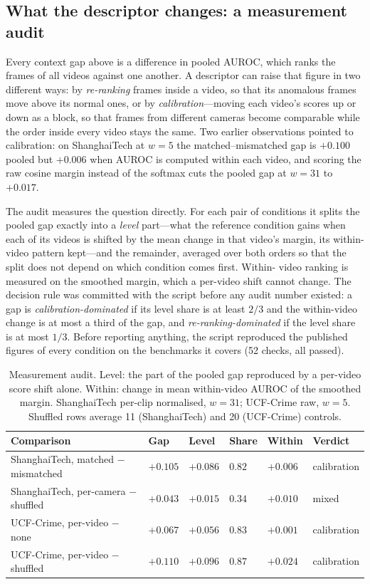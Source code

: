 \documentclass[a4paper,fleqn]{cas-sc}
\begin{document}
\subsection{What the descriptor changes: a measurement audit}
\label{sec:res-audit}
Every context gap above is a difference in pooled AUROC, which ranks the frames
of all videos against one another. A descriptor can raise that figure in two
different ways: by \emph{re-ranking} frames inside a video, so that its
anomalous frames move above its normal ones, or by \emph{calibration}---moving
each video's scores up or down as a block, so that frames from different cameras
become comparable while the order inside every video stays the same. Two earlier
observations pointed to calibration: on ShanghaiTech at $w{=}5$ the
matched--mismatched gap is $+0.100$ pooled but $+0.006$ when AUROC is computed
within each video, and scoring the raw cosine margin instead of the softmax cuts
the pooled gap at $w{=}31$ to $+0.017$.

The audit measures the question directly. For each pair of conditions it splits
the pooled gap exactly into a \emph{level} part---what the reference condition
gains when each of its videos is shifted by the mean change in that video's
margin, its within-video pattern kept---and the remainder, averaged over both
orders so that the split does not depend on which condition comes first. Within-
video ranking is measured on the smoothed margin, which a per-video shift cannot
change. The decision rule was committed with the script before any audit number
existed: a gap is \emph{calibration-dominated} if its level share is at least
$2/3$ and the within-video change is at most a third of the gap, and
\emph{re-ranking-dominated} if the level share is at most $1/3$. Before
reporting anything, the script reproduced the published figures of every
condition on the benchmarks it covers (52 checks, all passed).

\begin{table}[width=\linewidth,cols=6,pos=htbp]
\caption{Measurement audit. Level: the part of the pooled gap reproduced by a
per-video score shift alone. Within: change in mean within-video AUROC of the
smoothed margin. ShanghaiTech per-clip normalised, $w{=}31$; UCF-Crime raw,
$w{=}5$. Shuffled rows average 11 (ShanghaiTech) and 20 (UCF-Crime) controls.}
\label{tbl:audit}
\begin{tabularx}{\linewidth}{@{}Z l l l l l@{}}
\toprule
\textbf{Comparison} & \textbf{Gap} & \textbf{Level} & \textbf{Share} & \textbf{Within} & \textbf{Verdict} \\
\midrule
ShanghaiTech, matched $-$ mismatched & $+0.105$ & $+0.086$ & $0.82$ & $+0.006$ & calibration \\
ShanghaiTech, per-camera $-$ shuffled & $+0.043$ & $+0.015$ & $0.34$ & $+0.010$ & mixed \\
UCF-Crime, per-video $-$ none & $+0.067$ & $+0.056$ & $0.83$ & $+0.001$ & calibration \\
UCF-Crime, per-video $-$ shuffled & $+0.110$ & $+0.096$ & $0.87$ & $+0.024$ & calibration \\
\bottomrule
\end{tabularx}
\end{table}
\end{document}
